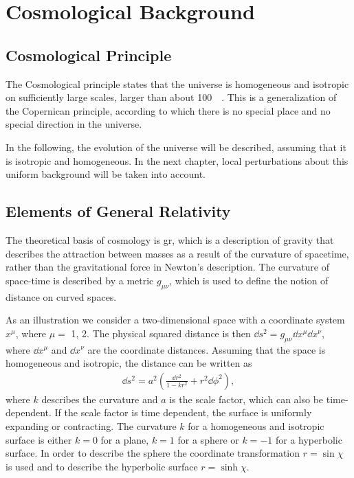 \chapter{Cosmological Background}

\section{Cosmological Principle}
The Cosmological principle states that the universe is homogeneous and isotropic on sufficiently large scales, larger than about \SI{100}{\mega\parsec}. This is a generalization of the Copernican principle, according to which there is no special place and no special direction in the universe.

In the following, the evolution of the universe will be described, assuming that it is isotropic and homogeneous. In the next chapter, local perturbations about this uniform background will be taken into account.


\section{Elements of General Relativity}
\label{sec:general-relativity}
The theoretical basis of cosmology is \ac{gr}, which is a description of gravity that describes the attraction between masses as a result of the curvature of spacetime, rather than the gravitational force in Newton's description. The curvature of space-time is described by a metric $g_{\mu\nu}$, which is used to define the notion of distance on curved spaces.


As an illustration we consider a two-dimensional space with a coordinate system $x^\mu$, where $\mu =$ 1, 2. The physical squared distance is then $\dd{s}^2 = g_{\mu\nu} \dd{x}^{\mu} \dd{x}^{\nu}$, where $\dd{x}^{\mu}$ and $\dd{x}^{\nu}$ are the coordinate distances. Assuming that the space is homogeneous and isotropic, the distance can be written as
\begin{align*}
	\dd{s}^2 = a^2 \left(\frac{\dd{r}^2}{1-kr^2} + r^2 \dd{\phi}^2\right),
\end{align*}
where $k$ describes the curvature and $a$ is the scale factor, which can also be time-dependent. If the scale factor is time dependent, the surface is uniformly expanding or contracting. The curvature $k$ for a homogeneous and isotropic surface is either $k = 0$ for a plane, $k = 1$ for a sphere or $k = -1$ for a hyperbolic surface. In order to describe the sphere the coordinate transformation $r = \sin\chi$ is used and to describe the hyperbolic surface $r = \sinh\chi$.

